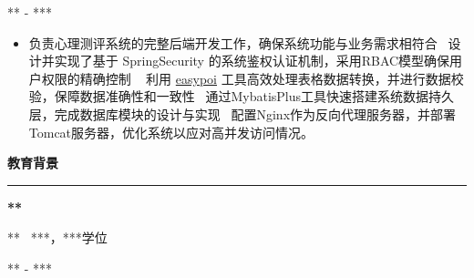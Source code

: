 \documentclass[11pt,a4paper]{article}
\renewcommand{\section}[1]{%
    \vspace{0.6em}%
    {\sffamily\Large\bfseries\color{sectioncolor}#1}%
    \vspace{0.2em}%
    \hrule height 0.5pt
    \vspace{0.4em}%
}
\newcommand{\company}[1]{%
    {\vspace{0.2em}\sffamily\textbf{\large#1}}%
}
\newcommand{\position}[2]{%
    \vspace{0.1em}  %
    \role{#1}\hfill\role{#2}%
    \vspace{0.2em}  %
}
\newcommand{\role}[1]{{\sffamily\color{graytext}\small#1}}
\newcommand{\daterange}[1]{\hfill{\sffamily\color{graytext}\small#1}}
\newcommand{\project}[1]{{\sffamily\textbf{\cjkit { \textit {\itshape#1}}}}}
\newcommand{\separator}{\textbullet~}  %
\begin{document}
\project{XXX系统}
\daterange{*** - ***}
\begin{itemize}
    \sloppy
    \item 负责心理测评系统的完整后端开发工作，确保系统功能与业务需求相符合 \separator 设计并实现了基于 SpringSecurity 的系统鉴权认证机制，采用RBAC模型确保用户权限的精确控制 \separator
    利用 \href{https://gitee.com/wupaas/easypoi}{easypoi} 工具高效处理表格数据转换，并进行数据校验，保障数据准确性和一致性 \separator 通过MybatisPlus工具快速搭建系统数据持久层，完成数据库模块的设计与实现 \separator 配置Nginx作为反向代理服务器，并部署Tomcat服务器，优化系统以应对高并发访问情况。
\end{itemize}

\section{教育背景}
\company{***} 
\position{*** \separator ***，***学位}{}

\daterange{*** - ***}
\end{document}
